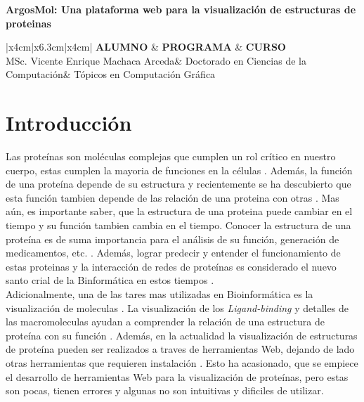 \documentclass{article}
\newcommand{\csdocente}{MSc. Vicente Enrique Machaca Arceda}
\newcommand{\cscurso}{Tópicos en Computación Gráfica}
\newcommand{\csescuela}{Doctorado en Ciencias de la Computación}
\begin{document}
	
	\vspace*{10px}
	
	\begin{center}	
		\fontsize{17}{17} \textbf{ ArgosMol: Una plataforma web para la visualización de estructuras de proteinas }
	\end{center}
	

	\begin{table}[h]
		\begin{tabular}{|x{4cm}|x{6.3cm}|x{4cm}|}
			\hline 
			\textbf{ALUMNO} & \textbf{PROGRAMA}  & \textbf{CURSO}   \\
			\hline 
			\csdocente & \csescuela & \cscurso    \\
			\hline 
		\end{tabular}
	\end{table}	
	
		
	
\section{Introducción}
	
	Las proteínas son moléculas complejas que cumplen un rol crítico en nuestro cuerpo, estas cumplen la mayoria de funciones en la células \citep{anderson1998proteome}. Además, la función de una proteína depende de su estructura \citep{rangwala2010introduction} y recientemente se ha descubierto que esta función tambien depende de las relación de una proteina con otras \citep{canzarprotein}. Mas aún, es importante saber, que la estructura de una proteina puede cambiar en el tiempo y su función tambien cambia en el tiempo. Conocer la estructura de una proteína es de suma importancia para el análisis de su función, generación de medicamentos, etc. \citep{rangwala2010introduction}. Además, lograr predecir y entender el funcionamiento de estas proteinas y la interacción de redes de proteínas es considerado el nuevo santo crial de la Binformática en estos tiempos \citep{srihari2017computational}. \\
	

	Adicionalmente, una de las tares mas  utilizadas en Bioinformática es la visualización de moleculas \citep{o2010visualization, mura2010introduction}. La visualización de los \textit{Ligand-binding} y detalles de las macromoleculas ayudan a comprender la relación de una estructura de proteína con su función \citep{reynolds2018ezmol}. Además, en la actualidad la visualización de estructuras de proteína pueden ser realizados a traves de herramientas Web, dejando de lado otras herramientas que requieren instalación \citep{wang2020icn3d}. Esto ha acasionado, que se empiece el desarrollo de herramientas Web para la visualización de proteínas, pero estas son pocas, tienen errores y algunas no son intuitivas y dificiles de utilizar.\\
	
\end{document}
